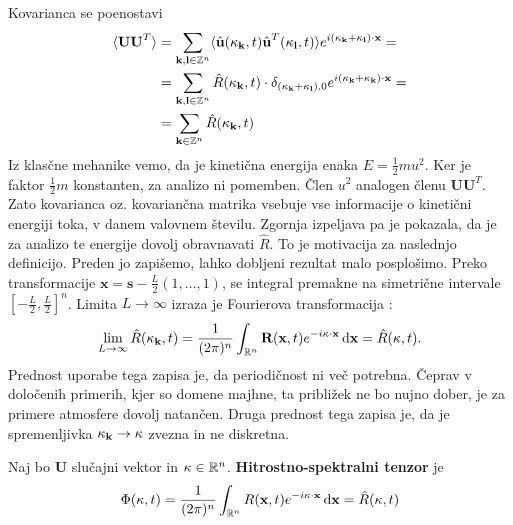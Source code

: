 \documentclass[mat2, tisk]{fmfdelo}
\newcommand{\R}{\mathbb R}
\newcommand{\Z}{\mathbb Z}
\newcommand{\bd}{\textbf}
\begin{document}
Kovarianca se poenostavi 
\begin{align*}
\langle \bd{U} \bd{U}^T\rangle &= \sum_{\bd{k}, \bd{l}\in \Z^{n}} \langle \hat{\bd{u}}(\bd{\text{$\kappa$}}_\bd{k}, t) \hat{\bd{u}}^T(\bd{\text{$\kappa$}}_\bd{l}, t) \rangle e^{i(\bd{\text{$\kappa$}}_\bd{k} + \bd{\text{$\kappa$}}_\bd{l})\cdot \bd{x}} = \\
&= \sum_{\bd{k}, \bd{l}\in \Z^{n}} \hat{R}(\text{\bd{$\kappa$}}_{\bd{k}}, t) \cdot \delta_{(\bd{\text{$\kappa$}}_{\bd{k}} + \bd{\text{$\kappa$}}_{\bd{l}}), 0} e^{i(\bd{\text{$\kappa$}}_\bd{k} + \bd{\text{$\kappa$}}_\bd{k})\cdot \bd{x}} = \\
&= \sum_{\bd{k}\in \Z^{n}} \hat{R}(\text{\bd{$\kappa$}}_{\bd{k}}, t)
\end{align*}
Iz klasčne mehanike vemo, da je kinetična energija enaka $E = \frac{1}{2} m u^2$. Ker je
faktor $\frac{1}{2} m$ konstanten, za analizo ni pomemben. Člen $u^2$ analogen členu $\bd{U} \bd{U}^T$. 
Zato kovarianca oz. kovariančna matrika vsebuje vse informacije o kinetični energiji toka, 
v danem valovnem številu.
Zgornja izpeljava pa je pokazala, da je za analizo te energije dovolj obravnavati 
$\hat{R}$. To je motivacija za naslednjo definicijo. Preden jo zapišemo, 
lahko dobljeni rezultat malo posplošimo. Preko transformacije $\bd{x} = \bd{s} - \frac{L}{2}(1, \dots, 1)$, 
se integral premakne na simetrične intervale 
$\left[-\frac{L}{2}, \frac{L}{2}\right]^n$. Limita $L \rightarrow \infty$ izraza je 
Fourierova transformacija :
\begin{align*}
\lim_{L\rightarrow \infty} \hat{R}(\bd{\text{$\kappa$}}_{\bd{k}}, t) = \frac{1}{(2\pi)^n}\int_{\R^n} \bd{R}(\bd{x}, t) e^{-i\text{\bd{$\kappa$}} \cdot \bd{x}} \dif \bd{x} = \hat{R}(\bd{\text{$\kappa$}}, t).
\end{align*}
Prednost uporabe tega zapisa je, da periodičnost ni več potrebna. Čeprav
v določenih primerih, kjer so domene majhne, ta približek ne bo nujno dober, 
je za primere atmosfere dovolj natančen. Druga prednost tega zapisa je, da je 
spremenljivka $\bd{\text{$\kappa$}}_{\bd{k}} \rightarrow \bd{\text{$\kappa$}}$
zvezna in ne diskretna.

\begin{definicija}
Naj bo $\bd{U}$ slučajni vektor in $\text{\bd{$\kappa$}} \in \R^n$. \bd{Hitrostno-spektralni tenzor} je 
\begin{equation}
\Phi(\text{\bd{$\kappa$}}, t) = \frac{1}{(2\pi)^n}\int_{\R^n} {R}(\bd{x}, t) e^{-i\text{\bd{$\kappa$}} \cdot \bd{x}} \dif \bd{x} = \hat{R}(\bd{\text{$\kappa$}}, t)
\end{equation}
\end{definicija}
\end{document}
